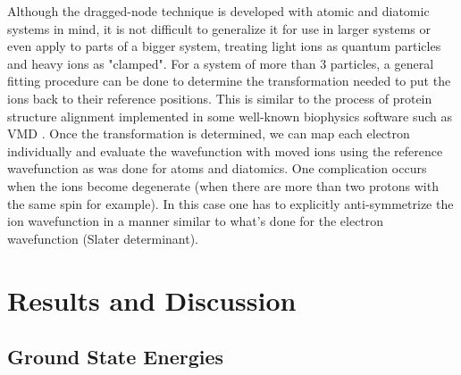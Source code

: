 \documentclass[aps,prl,superscriptaddress,groupedaddress]{revtex4}
\begin{document}
Although the dragged-node technique is developed with atomic and diatomic systems in mind, it is not difficult to generalize it for use in larger systems or even apply to parts of a bigger system, treating light ions as quantum particles and heavy ions as "clamped". For a system of more than 3 particles, a general fitting procedure \cite{Kabsch_Rotation} can be done to determine the transformation needed to put the ions back to their reference positions. This is similar to the process of protein structure alignment implemented in some well-known biophysics software such as VMD \cite{VMD}. Once the transformation is determined, we can map each electron individually and evaluate the wavefunction with moved ions using the reference wavefunction as was done for atoms and diatomics. One complication occurs when the ions become degenerate (when there are more than two protons with the same spin for example). In this case one has to explicitly anti-symmetrize the ion wavefunction in a manner similar to what's done for the electron wavefunction (Slater determinant). 

\section{Results and Discussion}

\subsection{Ground State Energies}
\end{document}
